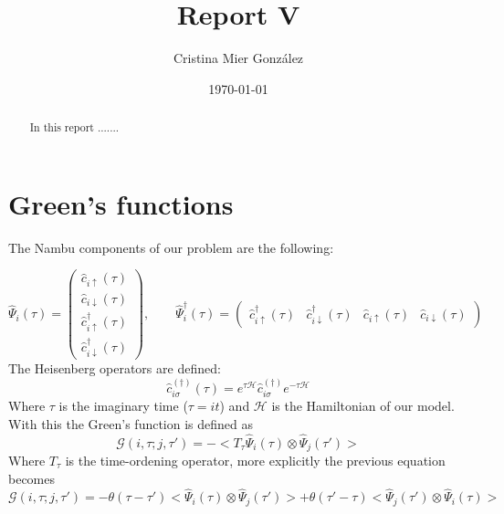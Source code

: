 \documentclass[letterpaper,12pt]{article}
\begin{document}
\title{Report V}
\author{Cristina Mier Gonz\'alez}
\date{\today}
\maketitle

\begin{abstract}
In this report .......

\end{abstract}

\section{Green's functions}

The Nambu components of our problem are the following:

\begin{equation*}
\hat{\Psi}_{i}(\tau) = 
    \begin{pmatrix}
    \hat{c}_{i\uparrow}(\tau) \\
    \hat{c}_{i\downarrow}(\tau) \\
    \hat{c}_{i\uparrow}^\dagger(\tau) \\
    \hat{c}_{i\downarrow}^\dagger(\tau) 
    \end{pmatrix},
\qquad
\hat{\Psi}_{i}^\dagger(\tau) = 
    \begin{pmatrix}
    \hat{c}_{i\uparrow}^\dagger(\tau) & \hat{c}_{i\downarrow}^\dagger(\tau) & \hat{c}_{i\uparrow}(\tau) & \hat{c}_{i\downarrow}(\tau)
    \end{pmatrix}
\end{equation*}
The Heisenberg operators are defined:
\begin{equation}
    \hat{c}_{i\sigma}^{(\dagger)}(\tau) = e^{\tau\mathcal{H}}\hat{c}_{i\sigma}^{(\dagger)}e^{-\tau\mathcal{H}}
    \label{Heisenberg}
\end{equation}
Where $\tau$ is the imaginary time ($\tau = it$) and $\mathcal{H}$ is the Hamiltonian of our model. With this the Green's function is defined as
\begin{equation}
    \mathcal{G}(i, \tau; j, \tau') = - < T_\tau \hat{\Psi}_i(\tau) \otimes \hat{\Psi}_j(\tau')>
\end{equation}
Where $T_\tau$ is the time-ordening operator, more explicitly the previous equation becomes
\begin{equation}
    \mathcal{G}(i, \tau; j, \tau') = - \theta(\tau - \tau')<\hat{\Psi}_i(\tau) \otimes \hat{\Psi}_j(\tau')> + \theta(\tau' - \tau)<\hat{\Psi}_j(\tau') \otimes \hat{\Psi}_i(\tau)>
\end{equation}
\end{document}
